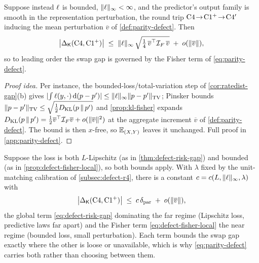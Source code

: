 \begin{proposition}
\label{prop:defect-fisher-local}
Suppose instead $\ell$ is bounded, $\|\ell\|_\infty<\infty$, and the predictor's
output family is smooth in the representation perturbation, the round trip
$\mathrm{C}4 \!\to\! \mathrm{C1^{+}} \!\to\! \mathrm{C}4'$ inducing the mean perturbation
$\overline{v}$ of \cref{def:parity-defect}. Then
\begin{equation}
  \label{eq:defect-fisher-local}
  \big|\Delta_{\mathsf{K}}(\mathrm{C}4,\mathrm{C1^{+}})\big|
  \;\le\;
  \|\ell\|_\infty\,\sqrt{\tfrac14\,\overline{v}^\top \mathcal{I}_{F}\, \overline{v}}
  \;+\; o(\|\overline{v}\|),
\end{equation}
so to leading order the swap gap is governed by the Fisher term of
\eqref{eq:parity-defect}.
\end{proposition}

\begin{proof}[Proof idea]
Per instance, the bounded-loss/total-variation step of
\cref{cor:ratedist-gap}(b) gives
$|\!\int\ell(y,\cdot)\,\mathrm{d}(p-p')|\le\|\ell\|_\infty\|p-p'\|_{\mathrm{TV}}$;
Pinsker bounds $\|p-p'\|_{\mathrm{TV}}\le\sqrt{\tfrac12D_{\mathrm{KL}}\!\left(p \,\Vert\, p'\right)}$ and
\cref{prop:kl-fisher} expands
$D_{\mathrm{KL}}\!\left(p \,\Vert\, p'\right)=\tfrac12\overline{v}^\top\mathcal{I}_{F}\overline{v}+o(\|\overline{v}\|^2)$ at
the aggregate increment $\overline{v}$ of \cref{def:parity-defect}. The bound is
then $x$-free, so $\mathbb{E}_{(X,Y)}$ leaves it unchanged. Full proof in
\cref{app:parity-defect}.
\end{proof}

\begin{corollary}
\label{cor:defect-two-term}
Suppose the loss is both $L$-Lipschitz (as in \cref{thm:defect-risk-gap}) and
bounded (as in \cref{prop:defect-fisher-local}), so both bounds apply. With
$\lambda$ fixed by the unit-matching calibration of \cref{subsec:defect-r4},
there is a constant $c=c(L,\|\ell\|_\infty,\lambda)$ with
\[
  \big|\Delta_{\mathsf{K}}(\mathrm{C}4,\mathrm{C1^{+}})\big|
  \;\le\; c\,\delta_{\mathrm{par}} \;+\; o(\|\overline{v}\|),
\]
the global term \eqref{eq:defect-risk-gap} dominating the far regime (Lipschitz
loss, predictive laws far apart) and the Fisher term
\eqref{eq:defect-fisher-local} the near regime (bounded loss, small
perturbation). Each term bounds the swap gap exactly where the other is loose or
unavailable, which is why \eqref{eq:parity-defect} carries both rather than
choosing between them.
\end{corollary}

